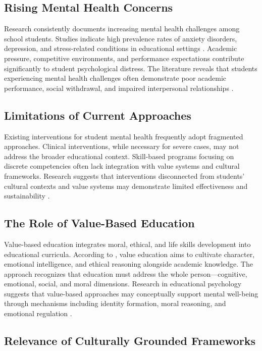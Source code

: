 \documentclass[12pt,a4paper,twocolumn]{article}
\begin{document}
\subsection{Rising Mental Health Concerns}

Research consistently documents increasing mental health challenges among school students. Studies indicate high prevalence rates of anxiety disorders, depression, and stress-related conditions in educational settings \citep{Pandey2019, Sharma2018}. Academic pressure, competitive environments, and performance expectations contribute significantly to student psychological distress. The literature reveals that students experiencing mental health challenges often demonstrate poor academic performance, social withdrawal, and impaired interpersonal relationships \citep{Singh2021, Kumaran2019}.

\subsection{Limitations of Current Approaches}

Existing interventions for student mental health frequently adopt fragmented approaches. Clinical interventions, while necessary for severe cases, may not address the broader educational context. Skill-based programs focusing on discrete competencies often lack integration with value systems and cultural frameworks. Research suggests that interventions disconnected from students' cultural contexts and value systems may demonstrate limited effectiveness and sustainability \citep{Nair2020, Narayan2015}.

\subsection{The Role of Value-Based Education}

Value-based education integrates moral, ethical, and life skills development into educational curricula. According to \citet{Narvaez2006}, value education aims to cultivate character, emotional intelligence, and ethical reasoning alongside academic knowledge. The approach recognizes that education must address the whole person—cognitive, emotional, social, and moral dimensions. Research in educational psychology suggests that value-based approaches may conceptually support mental well-being through mechanisms including identity formation, moral reasoning, and emotional regulation \citep{Desai2020, Sharma2017}.

\subsection{Relevance of Culturally Grounded Frameworks}
\end{document}
